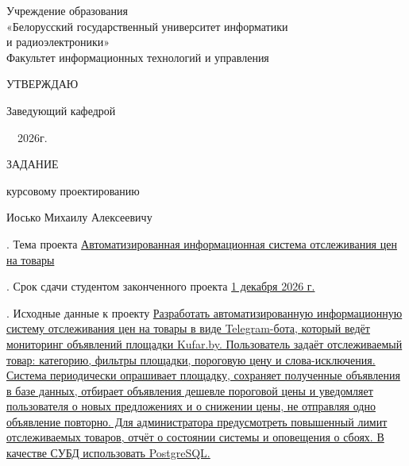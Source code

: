 
\setcounter{page}{2}
\sloppy
\thispagestyle{empty}

\begin{center}
Учреждение образования\\
«Белорусский государственный университет информатики\\
и радиоэлектроники»\\[0.5em]
Факультет информационных технологий и управления
\end{center}

\medskip

\hfill\begin{minipage}{\widthof{Заведующий кафедрой}}


  УТВЕРЖДАЮ

  Заведующий кафедрой


  \underline{\hphantom{хорошая дата }}\ \  2026г.

\end{minipage}
\medskip

\begin{center}
  \noindent
  ЗАДАНИЕ

   курсовому проектированию

  \bigskip
   Иосько Михаилу Алексеевичу
\end{center}

. Тема проекта \uline{Автоматизированная информационная система отслеживания цен на товары}

\smallskip
{}. Срок сдачи студентом законченного проекта \uline{\hfill 1 декабря 2026 г. \hfill}

\smallskip
{}. Исходные данные к проекту \uline{Разработать автоматизированную информационную систему отслеживания цен на товары в виде Telegram-бота, который ведёт мониторинг объявлений площадки Kufar.by. Пользователь задаёт отслеживаемый товар: категорию, фильтры площадки, пороговую цену и слова-исключения. Система периодически опрашивает площадку, сохраняет полученные объявления в базе данных, отбирает объявления дешевле пороговой цены и уведомляет пользователя о новых предложениях и о снижении цены, не отправляя одно объявление повторно. Для администратора предусмотреть повышенный лимит отслеживаемых товаров, отчёт о состоянии системы и оповещения о сбоях. В качестве СУБД использовать PostgreSQL.}

